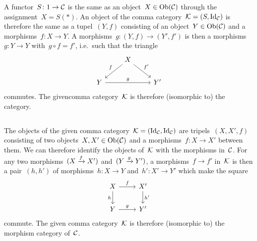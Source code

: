 A functor~$S \colon 1 \to \mathcal{C}$ is the same as an object~$X \in \operatorname{Ob}(\mathcal{C})$ through the assignment~$X = S(\ast)$.
An object of the comma category~$\mathcal{K} = (S,\mathrm{Id}_{\mathcal{C}})$ is therefore the same as a tupel~$(Y,f)$ consisting of an object~$Y \in \operatorname{Ob}(\mathcal{C})$ and a morphisms~$f \colon X \to Y$.
A morphisms~$g \colon (Y, f) \to (Y', f')$ is then a morphisms~$g \colon Y \to Y$ with~$g \circ f = f'$, i.e.\ such that the triangle
\[
  \begin{tikzcd}
      {}
    & X
      \arrow{dl}[above left]{f}
      \arrow{dr}[above right]{f'}
    & {}
    \\
      Y
      \arrow{rr}[above]{g}
    & {}
    & Y'
  \end{tikzcd}
\]
commutes.
The givencomma category~$\mathcal{K}$ is therefore (isomorphic to) the  category.





\subsection{}

The objects of the given comma category~$\mathcal{K} = (\mathrm{Id}_{\mathcal{C}}, \mathrm{Id}_{\mathcal{C}})$ are tripels~$(X, X', f)$ consisting of two objects~$X, X' \in \operatorname{Ob}(\mathcal{C})$ and a morphisms~$f \colon X \to X'$ between them.
We can therefore identify the objects of~$\mathcal{K}$ with the morphisms in~$\mathcal{C}$.
For any two morphisms~$(X \xrightarrow{f} X')$ and~$(Y \xrightarrow{g} Y')$, a morphisms~$f \to f'$ in~$\mathcal{K}$ is then a pair~$(h,h')$ of morphisms~$h \colon X \to Y$ and~$h' \colon X' \to Y'$ which make the square
\[
  \begin{tikzcd}
      X
      \arrow{r}[above]{f}
      \arrow{d}[left]{h}
    & X'
      \arrow{d}[right]{h'}
    \\
      Y
      \arrow{r}[above]{g}
    & Y'
  \end{tikzcd}
\]
commute.
The given comma category~$\mathcal{K}$ is therefore (isomorphic to) the morphism category of~$\mathcal{C}$.





\subsection{}


